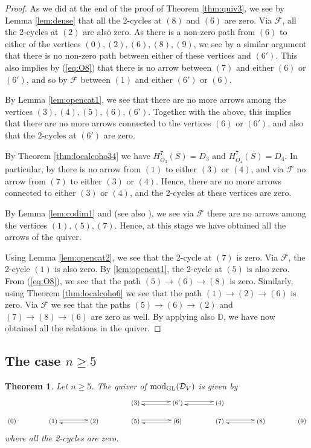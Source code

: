 \documentclass[11pt,reqno]{amsart}
\newcommand{\D}{\mathcal{D}}
\newcommand{\tn}{\textnormal}
\newcommand{\GL}{\operatorname{GL}}
\newcommand{\bb}[1]{\mathbb{#1}}
\newcommand{\mc}[1]{\mathcal{#1}}
\newtheorem{theorem}{Theorem}[section]
\numberwithin{equation}{section}
\begin{document}
\begin{proof}
As we did at the end of the proof of Theorem \ref{thm:quiv3}, we see by Lemma \ref{lem:dense} that all the 2-cycles at $(8)$ and $(6)$ are zero. Via $\mc{F}$, all the 2-cycles at $(2)$ are also zero. As there is a non-zero path from $(6)$ to either of the vertices $(0), (2), (6), (8), (9)$, we see by a similar argument that there is no non-zero path between either of these vertices and $(6')$. This also implies by (\ref{eq:O8}) that there is no arrow between $(7)$ and either $(6)$ or $(6')$, and so by $\mc{F}$ between $(1)$ and either $(6')$ or $(6)$.

By Lemma \ref{lem:opencat1}, we see that there are no more arrows among the vertices $(3), (4), (5), (6), (6')$. Together with the above, this implies that there are no more arrows connected to the vertices $(6)$ or $(6')$, and also that the 2-cycles at $(6')$ are zero. 

By Theorem \ref{thm:localcoho34} we have $H^7_{\overline{O}_3}(S)=D_3$ and $H^7_{\overline{O}_4}(S)=D_4$. In particular, by \cite[Lemma 3.11]{lHorincz2019categories} there is no arrow from $(1)$ to either $(3)$ or $(4)$, and via $\mc{F}$ no arrow from $(7)$ to either $(3)$ or $(4)$. Hence, there are no more arrows connected to either $(3)$ or $(4)$, and the 2-cycles at these vertices are zero.

By Lemma \ref{lem:codim1} and \cite[Theorem 6.7]{macvil} (see also \cite{kk}), we see via $\mc{F}$ there are no arrows among the vertices $(1), (5), (7)$. Hence, at this stage we have obtained all the arrows of the quiver. 

Using Lemma \ref{lem:opencat2}, we see that the 2-cycle at $(7)$ is zero. Via $\mc{F}$, the 2-cycle $(1)$ is also zero. By \ref{lem:opencat1}, the 2-cycle at $(5)$ is also zero. From (\ref{eq:O8}), we see that the path $(5) \to (6) \to (8)$ is zero. Similarly, using Theorem \ref{thm:localcoho6} we see that the path $(1)\to (2) \to (6)$ is zero. Via $\mc{F}$  we see that the paths $(5) \to (6) \to (2)$ and $(7)\to (8) \to (6)$ are zero as well. By applying also $\bb{D}$, we have now obtained all the relations in the quiver.
\end{proof}



\subsection{The case $n\geq 5$}\label{sec:n5}

\begin{theorem}\label{quiverN5}
Let $n\geq 5$. The quiver of $\tn{mod}_{\GL}(\D_V)$ is given by
\[\xymatrix@R-1pc@C+1.6pc{
& & & (3) \ar@<0.5ex>[r] & \ar@<0.5ex>[l] (6') \ar@<0.5ex>[r] & \ar@<0.5ex>[l] (4) & \\
(0) & (1) \ar@<0.5ex>[r] & (2) \ar@<0.5ex>[l] & (5) \ar@<0.5ex>[r] & (6) \ar@<0.5ex>[l] & \ar@<0.5ex>[r] (7) & \ar@<0.5ex>[l] (8) & (9)
}\]
where all the 2-cycles are zero.
\end{theorem}
\end{document}
